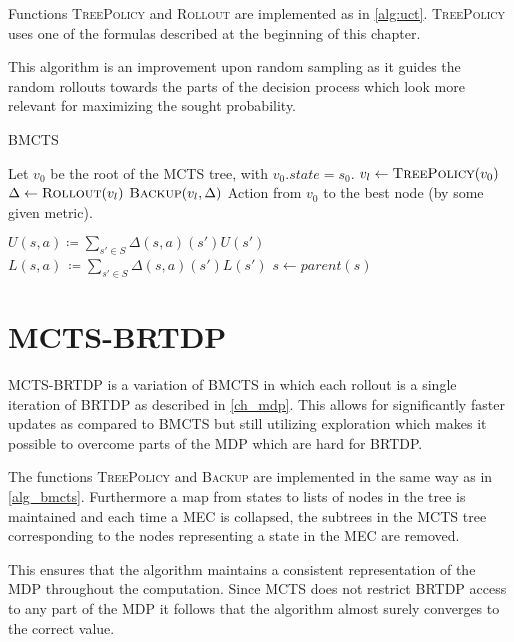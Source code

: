 Functions \textsc{TreePolicy} and \textsc{Rollout} are implemented as in
\autoref{alg:uct}. \textsc{TreePolicy} uses one of the formulas
described at the beginning of this chapter.

This algorithm is an improvement upon random sampling as it guides the
random rollouts towards the parts of the decision process which look
more relevant for maximizing the sought probability.

\begin{algorithm}
\caption{BMCTS}
\label{alg_bmcts}
\begin{algorithmic}
    \State Let $v_0$ be the root of the MCTS tree, with $v_0.state = s_0$.
        \State $v_l \gets \Call{TreePolicy}{v_0}$
        \State $\Delta \gets \Call{Rollout}{v_l}$
        \State $\Call{Backup}{v_l, \Delta}$
    \EndWhile
    \State \Return Action from $v_0$ to the best node (by some
    given metric).
\EndFunction

\Repeat
    \State $U(s,a) \coloneqq \sum_{s' \in S} \Delta(s,a)(s')U(s')$
    \State $L(s,a)\, \coloneqq \sum_{s' \in S} \Delta(s,a)(s')L(s')$
    \State $s \gets parent(s)$
\EndFunction
\end{algorithmic}
\end{algorithm}

\section{MCTS-BRTDP}

MCTS-BRTDP is a variation of BMCTS in which each rollout is a
single iteration of BRTDP as described in \autoref{ch_mdp}. This allows
for significantly faster updates as compared to BMCTS but still
utilizing exploration which makes it possible to overcome parts of the
MDP which are hard for BRTDP.

The functions \textsc{TreePolicy} and \textsc{Backup} are implemented in
the same way as in \autoref{alg_bmcts}. Furthermore a map from states to
lists of nodes in the tree is maintained and each time a MEC is
collapsed, the subtrees in the MCTS tree corresponding to the nodes
representing a state in the MEC are removed.

This ensures that the algorithm maintains a consistent representation of
the MDP throughout the computation. Since MCTS does not restrict BRTDP
access to any part of the MDP it follows that the algorithm almost
surely converges to the correct value.

